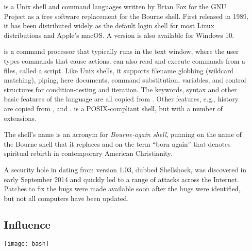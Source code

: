 \documentclass[../Languages.tex]{subfiles}
\begin{document}
\label{sec:bash}

 is a Unix shell and command languages written by Brian Fox for the
GNU Project as a free software replacement for the Bourne shell. First released
in 1989, it has been distributed widely as the default login shell for most
Linux distributions and Apple's macOS. A version is also available for Windows
10.

 is a command processor that typically runs in the text window, where
the user types commands that cause actions.  can also read and execute
commands from a files, called a script. Like Unix shells, it supports filename
globbing (wildcard matching), piping, here documents, command substitution,
variables, and control structures for condition-testing and iteration. The
keywords, syntax and other basic features of the language are all copied from
. Other features, e.g., history are copied from , and .
 is a POSIX-compliant shell, but with a number of extensions.

The shell's name is an acronym for \textit{Bourne-again shell}, punning on the
name of the Bourne shell that it replaces and on the term ``born again'' that
denotes spiritual rebirth in contemporary American Christianity.

A security hole in  dating from version 1.03, dubbed Shellshock, was
discovered in early September 2014 and quickly led to a range of attacks across
the Internet. Patches to fix the bugs were made available soon after the bugs
were identified, but not all computers have been updated.

\subsection{Influence}
\label{sub:influence}

\begin{Figure}
   \centering
   \texttt{[image: bash]}
\end{Figure}

\newpage
\end{document}
